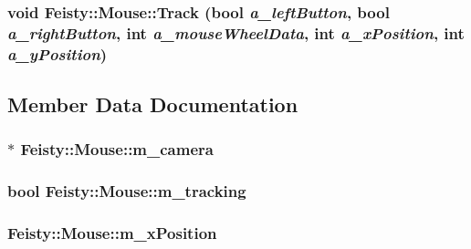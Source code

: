\label{class_feisty_1_1_mouse_adf5f8bcd509c14193e883e7709ec6dd9}
\hypertarget{class_feisty_1_1_mouse_ab70372e63d02a6a781b00bd46e7ccca7}{
\subsubsection[{Track}]{\setlength{\rightskip}{0pt plus 5cm}void Feisty::Mouse::Track (bool {\em a\_\-leftButton}, \/  bool {\em a\_\-rightButton}, \/  {\bf int} {\em a\_\-mouseWheelData}, \/  {\bf int} {\em a\_\-xPosition}, \/  {\bf int} {\em a\_\-yPosition})}}
\label{class_feisty_1_1_mouse_ab70372e63d02a6a781b00bd46e7ccca7}


\subsection{Member Data Documentation}
\hypertarget{class_feisty_1_1_mouse_a144e77580d9067ccb09a401fea5c60f2}{
\subsubsection[{m\_\-camera}]{$\ast$ {\bf Feisty::Mouse::m\_\-camera}}}
\label{class_feisty_1_1_mouse_a144e77580d9067ccb09a401fea5c60f2}
\hypertarget{class_feisty_1_1_mouse_a27b4fe989daff9bd9ff031b485a5f51a}{
\subsubsection[{m\_\-tracking}]{\setlength{\rightskip}{0pt plus 5cm}bool {\bf Feisty::Mouse::m\_\-tracking}}}
\label{class_feisty_1_1_mouse_a27b4fe989daff9bd9ff031b485a5f51a}
\hypertarget{class_feisty_1_1_mouse_a57c3e21679268866baf51dc697ea682a}{
\subsubsection[{m\_\-xPosition}]{ {\bf Feisty::Mouse::m\_\-xPosition}}}
